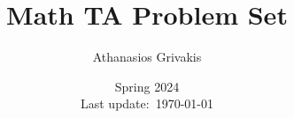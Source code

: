 \documentclass{article}
\begin{document}
\title{Math TA Problem Set}
\author{Athanasios Grivakis}
\date{Spring 2024\\ Last update:~\today}
\maketitle
\tableofcontents
\vspace{5em}

\newpage





\end{document}
